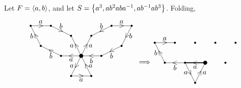 \pagebreak

\begin{example}
Let $ F = \abr{a, b} $, and let $ S = \cbr{a^3, ab^2aba^{-1}, ab^{-1}ab^3} $. Folding,
$$
\begin{tikzpicture}
\fill (0, 0) circle (0.1);
\fill (-0.5, -1) circle (0.05);
\fill (0.5, -1) circle (0.05);
\fill (-1, 0) circle (0.05);
\fill (-2, 0.5) circle (0.05);
\fill (-2.5, 1.5) circle (0.05);
\fill (-1.5, 1.5) circle (0.05);
\fill (-0.5, 1) circle (0.05);
\fill (0.5, 1) circle (0.05);
\fill (1.5, 1.5) circle (0.05);
\fill (2.5, 1.5) circle (0.05);
\fill (2, 0.5) circle (0.05);
\fill (1, 0) circle (0.05);
\draw (0, 0) to node{\rotatebox{60}{$ < $}} node[left]{$ a $} (-0.5, -1);
\draw (-0.5, -1) to node{$ > $} node[below]{$ a $} (0.5, -1);
\draw (0.5, -1) to node{\rotatebox{30}{$ \wedge $}} node[right]{$ a $} (0, 0);
\draw (0, 0) to node{$ < $} node[below]{$ a $} (-1, 0);
\draw (-1, 0) to node{\rotatebox{60}{$ \wedge $}} node[below]{$ b $} (-2, 0.5);
\draw (-2, 0.5) to node{\rotatebox{30}{$ \wedge $}} node[left]{$ b $} (-2.5, 1.5);
\draw (-2.5, 1.5) to node{$ > $} node[above]{$ a $} (-1.5, 1.5);
\draw (-1.5, 1.5) to node{\rotatebox{60}{$ \vee $}} node[above]{$ b $} (-0.5, 1);
\draw (0, 0) to node{\rotatebox{30}{$ \wedge $}} node[left]{$ a $} (-0.5, 1);
\draw (0, 0) to node{\rotatebox{60}{$ > $}} node[right]{$ a $} (0.5, 1);
\draw (1.5, 1.5) to node{\rotatebox{30}{$ < $}} node[above]{$ b $} (0.5, 1);
\draw (1.5, 1.5) to node{$ > $} node[above]{$ a $} (2.5, 1.5);
\draw (2.5, 1.5) to node{\rotatebox{60}{$ < $}} node[right]{$ b $} (2, 0.5);
\draw (2, 0.5) to node{\rotatebox{30}{$ < $}} node[below]{$ b $} (1, 0);
\draw (1, 0) to node{$ < $} node[below]{$ b $} (0, 0);
\end{tikzpicture}
\begin{tikzpicture}
\draw (-3, 0) node{$ \implies $};
\fill (0, 0) circle (0.1);
\fill (-1, 0) circle (0.05);
\fill (-0.5, -1) circle (0.05);
\fill (-2, 0) circle (0.05);
\fill (-2.5, 1) circle (0.05);
\fill (-1.5, 1) circle (0.05);
\fill (-0.5, 1) circle (0.05);
\fill (0.5, 1) circle (0.05);
\fill (1.5, 1) circle (0.05);
\fill (1, 0) circle (0.05);
\draw [very thick] (0, 0) to node{$ < $} node[below]{$ a $} (-1, 0);
\draw (-1, 0) to node{\rotatebox{30}{$ \vee $}} node[left]{$ a $} (-0.5, -1);
\draw (-0.5, -1) to node{\rotatebox{60}{$ > $}} node[right]{$ a $} (0, 0);
\draw (-1, 0) to node{$ < $} node[below]{$ b $} (-2, 0);
\draw (-2, 0) to node{\rotatebox{30}{$ \wedge $}} node[left]{$ b $} (-2.5, 1);
\draw (-2.5, 1) to node{$ > $} node[above]{$ a $} (-1.5, 1);

\end{tikzpicture}$$
\end{example}

